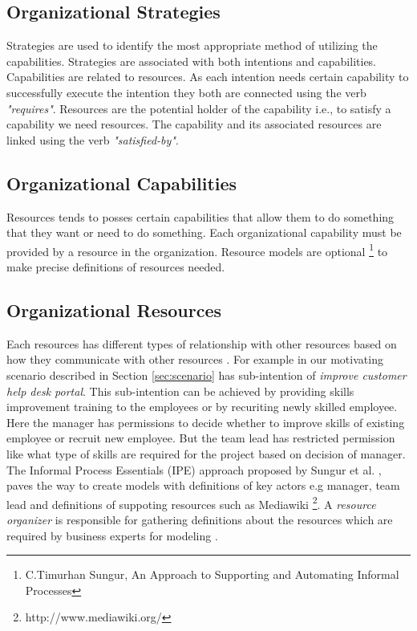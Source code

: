 \subsection{Organizational Strategies} 
\label{sec:strategies}
Strategies are used to identify the most appropriate method of utilizing the capabilities. Strategies are associated with both intentions and capabilities. Capabilities are related to resources. As each intention needs certain capability to successfully execute the intention they both are connected using the verb \textit{"requires"}. Resources are the potential holder of the capability i.e., to satisfy a capability we need resources. The capability and its associated resources are linked using the verb \textit{"satisfied-by"}. 


\subsection{Organizational Capabilities}
\label{sec:capabilities}
Resources tends to posses certain capabilities that allow them to do something that they want or need to do something. Each organizational capability must be provided by a resource in the organization. Resource models are optional \footnote{C.Timurhan Sungur, An Approach to Supporting and Automating Informal Processes} to make precise definitions of resources needed. 

 

\subsection{Organizational Resources} 
\label{sec:resources}
Each resources has different types of relationship with other resources based on how they communicate with other resources \cite{Sungur2015}. For example in our motivating scenario described in Section \ref{sec:scenario} has sub-intention of \textit{improve customer help desk portal}. This sub-intention can be achieved by providing skills improvement training to the employees or by recuriting newly skilled employee. Here the manager has permissions to decide whether to improve skills of existing employee or recruit new employee. But the team lead has restricted permission like what type of skills are required for the project based on decision of manager. The Informal Process Essentials (IPE) approach proposed by Sungur et al. \cite{Sungur2015}, paves the way to create models with definitions of key actors e.g manager, team lead and definitions of suppoting resources such as Mediawiki \footnote{http://www.mediawiki.org/}. A \textit{resource organizer} is responsible for gathering definitions about the resources which are required by business experts for modeling \cite{Sungur2014a}.  



